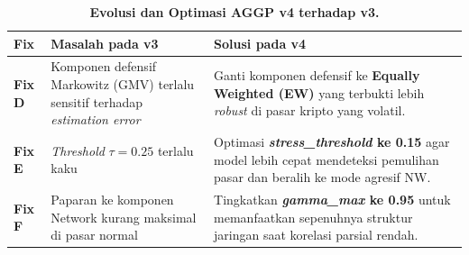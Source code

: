 \documentclass[12pt,a4paper]{article}
\begin{document}
\begin{table}[h]
    \centering
    \footnotesize
    \caption{\textbf{Evolusi dan Optimasi AGGP v4 terhadap v3.}}
    \begin{tabular}{p{0.8cm} p{4.5cm} p{8.5cm}}
        \toprule
        \textbf{Fix} & \textbf{Masalah pada v3} & \textbf{Solusi pada v4} \\
        \midrule
        \textbf{Fix D} &
        Komponen defensif Markowitz (GMV) terlalu sensitif terhadap \textit{estimation error} &
        Ganti komponen defensif ke \textbf{Equally Weighted (EW)} yang terbukti lebih \textit{robust} di pasar kripto yang volatil. \\
        \midrule
        \textbf{Fix E} &
        \textit{Threshold} $\tau=0.25$ terlalu kaku &
        Optimasi \textbf{\textit{stress\_threshold} ke 0.15} agar model lebih cepat mendeteksi pemulihan pasar dan beralih ke mode agresif NW. \\
        \midrule
        \textbf{Fix F} &
        Paparan ke komponen Network kurang maksimal di pasar normal &
        Tingkatkan \textbf{\textit{gamma\_max} ke 0.95} untuk memanfaatkan sepenuhnya struktur jaringan saat korelasi parsial rendah. \\
        \bottomrule
    \end{tabular}
\end{table}
\end{document}
